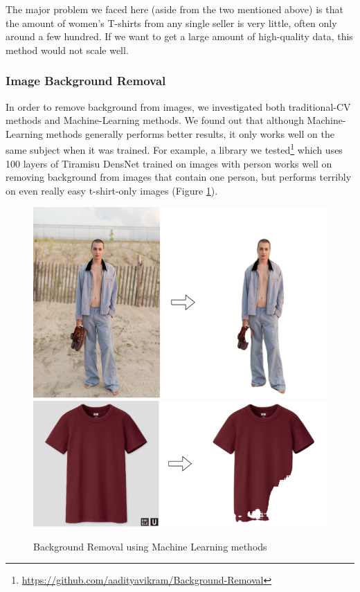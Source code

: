 \documentclass{article}
\begin{document}
The major problem we faced here (aside from the two mentioned above) is that the amount of women's T-shirts from any single seller is very little, often only around a few hundred. If we want to get a large amount of high-quality data, this method would not scale well.

\subsubsection{Image Background Removal}
In order to remove background from images, we investigated both traditional-CV methods and Machine-Learning methods. We found out that although Machine-Learning methods generally performs better results, it only works well on the same subject when it was trained. For example, a library we tested\footnote{\url{https://github.com/aadityavikram/Background-Removal}} which uses 100 layers of Tiramisu DensNet trained on images with person works well on removing background from images that contain one person, but performs terribly on even really easy t-shirt-only images (Figure \ref{fig:bgrm-ml}).

\begin{figure}[H]
    \centering
    \includegraphics[width=1\textwidth]{rmbg/ml-person.png}
    \includegraphics[width=1\textwidth]{rmbg/ml-tshirt.png}
    \caption{Background Removal using Machine Learning methods}
    \label{fig:bgrm-ml}
\end{figure}
\end{document}
